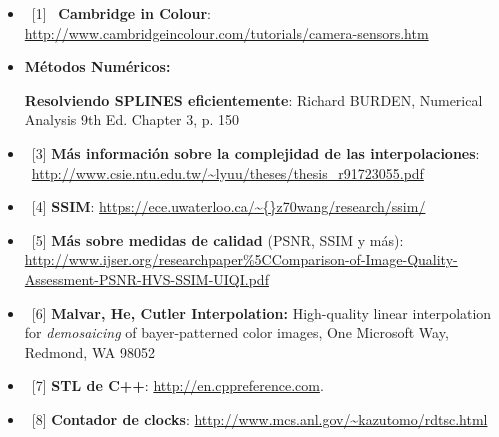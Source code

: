 \begin{itemize}
\item \ [1] \ \textbf{Cambridge in Colour}:  \url{http://www.cambridgeincolour.com/tutorials/camera-sensors.htm}
\item \textbf{Métodos Numéricos:}
		\par [2] \textbf{Resolviendo SPLINES eficientemente}: Richard BURDEN, Numerical Analysis 9th Ed. Chapter 3, p. 150
\item \ [3] \textbf{Más información sobre la complejidad de las interpolaciones}: \ \url{http://www.csie.ntu.edu.tw/~lyuu/theses/thesis\_r91723055.pdf}
\item \ [4] \textbf{SSIM}:  \url{https://ece.uwaterloo.ca/\~{}z70wang/research/ssim/}
\item \ [5] \textbf{Más sobre medidas de calidad} (PSNR, SSIM y más): \url{http://www.ijser.org/researchpaper\%5CComparison-of-Image-Quality-Assessment-PSNR-HVS-SSIM-UIQI.pdf}
\item \ [6] \textbf{Malvar, He, Cutler Interpolation:} High-quality linear interpolation for \textit{demosaicing} of bayer-patterned color images, One Microsoft Way, Redmond, WA 98052
\item \ [7] \textbf{STL de C++}: \url{http://en.cppreference.com}.
\item \ [8] \textbf{Contador de clocks}: \url{http://www.mcs.anl.gov/\~kazutomo/rdtsc.html}

\end{itemize}



